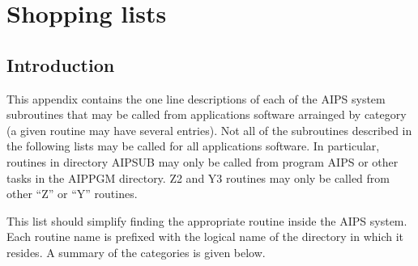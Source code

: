 \setcounter{chapter}{1} %
\chapter{Shopping lists}
\setcounter{page}{1}
\section{Introduction}
This appendix contains the one line descriptions of each of the AIPS
system subroutines that may be called from applications software
arrainged by category (a given routine may have several entries).
Not all of the subroutines described in the following lists may be
called for all applications software.  In particular, routines in
directory AIPSUB may only be called from program AIPS or other tasks
in the AIPPGM directory.  Z2 and Y3 routines may only be called from
other ``Z'' or ``Y'' routines.


This list should simplify finding the appropriate routine inside the
AIPS system.  Each routine name is prefixed with the logical name of
the directory in which it resides.  A summary of the categories is
given below.

